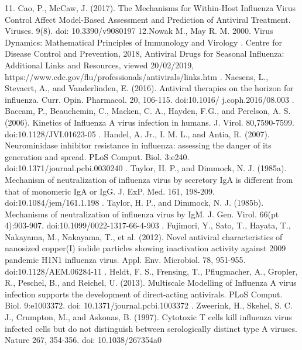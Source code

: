 \documentclass[a4paper,11pt]{article}
\begin{document}
{11. Cao, P., McCaw, J. (2017). The Mechanisms for Within-Host Influenza Virus Control Affect Model-Based Assessment and Prediction of Antiviral Treatment. Viruses. 9(8). doi: 10.3390/v9080197\newline
12.Nowak M., May R. M. 2000. Virus Dynamics: Mathematical Principles of Immunology and Virology . Centre for Disease Control and Prevention, 2018, Antiviral Drugs for Seasonal Influenza: Additional Links and Resources, viewed 20/02/2019, https://www.cdc.gov/flu/professionals/antivirals/links.htm . Naesens, L., Stevaert, A., and Vanderlinden, E. (2016). Antiviral therapies on the horizon for influenza. Curr. Opin. Pharmacol. 20, 106-115. doi:10.1016/ j.coph.2016/08.003} . Baccam, P., Beauchemin, C., Macken, C. A., Hayden, F.G., and Perelson, A. S. (2006). Kinetics of Influenza A virus infection in humans. J. Virol. 80,7590-7599. doi:10.1128/JVI.01623-05 . Handel, A. Jr., I. M. L., and Antia, R. (2007). Neurominidase inhibitor resistance in influenza: assessing the danger of its generation and spread. PLoS Comput. Biol. 3:e240. doi:10.1371/journal.pcbi.0030240 . Taylor, H. P., and Dimmock, N. J. (1985a). Mechanism of neutralization of influenza virus by secretory IgA is different from that of monomeric IgA or IgG. J. ExP. Med. 161, 198-209. doi:10.1084/jem/161.1.198 . Taylor, H. P., and Dimmock, N. J. (1985b). Mechanisms of neutralization of influenza virus by IgM. J. Gen. Virol. 66(pt 4):903-907. doi:10.1099/0022-1317-66-4-903 . Fujimori, Y., Sato, T., Hayata, T., Nakayama, M., Nakayama, T., et al. (2012). Novel antiviral characteristics of nanosized copper(I) iodide particles showing inactivation activity against 2009 pandemic H1N1 influenza virus. Appl. Env. Microbiol. 78, 951-955. doi:10.1128/AEM.06284-11 . Heldt, F. S., Frensing, T., Pflugmacher, A., Gropler, R., Peschel, B., and Reichel, U. (2013). Multiscale Modelling of Influenza A virus infection supports the development of direct-acting antivirals. PLoS Comput. Biol. 9:e1003372. doi: 10.1371/journal.pcbi.1003372 . Zweerink, H., Skehel, S. C. J., Crumpton, M., and Askonas, B. (1997). Cytotoxic T cells kill influenza virus infected cells but do not distinguish between serologically distinct type A viruses. Nature 267, 354-356. doi: 10.1038/267354a0 \newline
\end{document}
